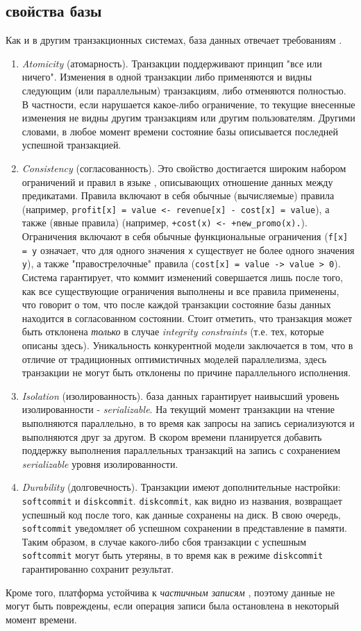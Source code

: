 \subsection{\acid свойства базы}
\label{sec:technology:acid}

Как и в другим транзакционных системах, база данных \LB отвечает требованиям \acid \cite{lb_acid}.

\begin{enumerate}
  \item \emph{Atomicity} (атомарность). Транзакции поддерживают принцип "все или ничего". Изменения в одной транзакции либо применяются и видны следующим (или параллельным) транзакциям, либо отменяются полностью. В частности, если нарушается какое-либо ограничение, то текущие внесенные изменения не видны другим транзакциям или другим пользователям. Другими словами, в любое момент времени состояние базы описывается последней успешной транзакцией.
  \item \emph{Consistency} (согласованность). Это свойство достигается широким набором ограничений и  правил в языке \logiql, описывающих отношение данных между предикатами. Правила включают в себя обычные \idb (вычисляемые) правила (например, \lstinline{profit[x] = value <- revenue[x] - cost[x] = value}), а также \edb (явные правила) (например, \lstinline{+cost(x) <- +new_promo(x).}). Ограничения включают в себя обычные функциональные ограничения (\lstinline{f[x] = y} означает, что для одного значения \lstinline{x} существует не более одного значения \lstinline{y}), а также "правострелочные" правила (\lstinline{cost[x] = value -> value > 0}). Система гарантирует, что коммит изменений совершается лишь после того, как все существующие ограничения выполнены и все правила применены, что говорит о том, что после каждой транзакции состояние базы данных находится в согласованном состоянии. Стоит отметить, что транзакция может быть отклонена \emph{только} в случае \emph{integrity constraints} (т.е. тех, которые описаны здесь). Уникальность конкурентной модели \LB заключается в том, что в отличие от традиционных оптимистичных моделей параллелизма, здесь транзакции не могут быть отклонены по причине параллельного исполнения.
  \item \emph{Isolation} (изолированность). \LB база данных гарантирует наивысший уровень изолированности - \emph{serializable}. На текущий момент транзакции на чтение выполняются параллельно, в то время как запросы на запись сериализуются и выполняются друг за другом. В скором времени планируется добавить поддержку выполнения параллельных транзакций на запись с сохранением \emph{serializable} уровня изолированности.
  \item \emph{Durability} (долговечность). Транзакции имеют дополнительные настройки: \lstinline{softcommit} и \lstinline{diskcommit}. \lstinline{diskcommit}, как видно из названия, возвращает успешный код после того, как данные сохранены на диск. В свою очередь, \lstinline{softcommit} уведомляет об успешном сохранении в представление в памяти. Таким образом, в случае какого-либо сбоя транзакции с успешным \lstinline{softcommit} могут быть утеряны, в то время как в режиме  \lstinline{diskcommit} гарантированно сохранит результат.
\end{enumerate}

Кроме того, платформа \LB устойчива к \emph{частичным записям} \cite{partial_writes_def}, поэтому данные не могут быть повреждены, если операция записи была остановлена в некоторый момент времени.
